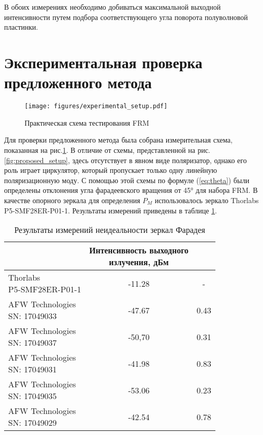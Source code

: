 \documentclass{article}
\begin{document}
В обоих измерениях необходимо добиваться максимальной выходной интенсивности путем подбора соответствующего угла поворота полуволновой пластинки.

\section{Экспериментальная проверка предложенного метода}
\begin{figure}[b]
	\centering
	\texttt{[image: figures/experimental\_setup.pdf]}
	\caption{Практическая схема тестирования FRM}
	\label{fig:experimantalScheme}
\end{figure}

Для проверки предложенного метода была собрана измерительная схема, показанная на рис.\ref{fig:experimantalScheme}.
В отличие от схемы, представленной на рис.\ref{fig:proposed_setup}, здесь отсутствует в явном виде поляризатор, однако его роль играет циркулятор, который пропускает только одну линейную поляризационную моду.
С помощью этой схемы по формуле (\ref*{eq:theta}) были определены отклонения угла фарадеевского вращения от 45° для набора FRM.
В качестве опорного зеркала для определения $P_M$ использовалось зеркало Thorlabs P5-SMF28ER-P01-1.
Результаты измерений приведены в таблице \ref{tabular:results}.
\begin{table}[h]
	\caption{Результаты измерений неидеальности зеркал Фарадея}
	\label{tabular:results}
		\begin{tabularx}{\textwidth}{|X|c|c|}
			\hline
			\thead{Зеркало} & \thead{Интенсивность выходного \\ излучения, дБм} & \thead{Неидеальность FRM, град} \\
			\hline
			\makecell{Thorlabs \\ P5-SMF28ER-P01-1} & -11.28 & - \\	
			\hline
			\makecell{AFW Technologies \\ SN: 17049033} & -47.67 & 0.43 \\
			\hline
			\makecell{AFW Technologies \\ SN: 17049037}	& -50,70 & 0.31 \\
			\hline
			\makecell{AFW Technologies \\ SN: 17049031}	& -41.98 & 0.83 \\
			\hline
			\makecell{AFW Technologies \\ SN: 17049035}	& -53.06 & 0.23 \\
			\hline
			\makecell{AFW Technologies \\ SN: 17049029} & -42.54 & 0.78 \\
			\hline
		\end{tabularx}
\end{table}
\end{document}

